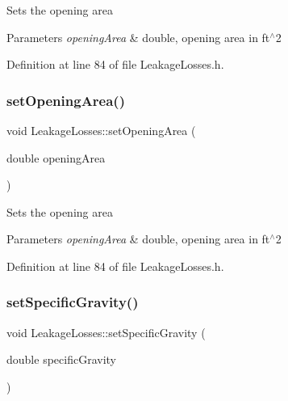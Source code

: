 Sets the opening area 
\begin{DoxyParams}{Parameters}
{\em opening\+Area} & double, opening area in ft$^\wedge$2 \\
\hline
\end{DoxyParams}


Definition at line 84 of file Leakage\+Losses.\+h.

\mbox{\label{class_leakage_losses_a417c9914af6b283695bdbd5e92451f9e}} 
\subsubsection{\texorpdfstring{set\+Opening\+Area()}{setOpeningArea()}\hspace{0.1cm}{\footnotesize\ttfamily [3/3]}}
{\footnotesize\ttfamily void Leakage\+Losses\+::set\+Opening\+Area (\begin{DoxyParamCaption}\item[{double}]{opening\+Area }\end{DoxyParamCaption})\hspace{0.3cm}{\ttfamily [inline]}}

Sets the opening area 
\begin{DoxyParams}{Parameters}
{\em opening\+Area} & double, opening area in ft$^\wedge$2 \\
\hline
\end{DoxyParams}


Definition at line 84 of file Leakage\+Losses.\+h.

\mbox{\label{class_leakage_losses_ab017828413655c5903374564e8718fac}} 
\subsubsection{\texorpdfstring{set\+Specific\+Gravity()}{setSpecificGravity()}\hspace{0.1cm}{\footnotesize\ttfamily [1/3]}}
{\footnotesize\ttfamily void Leakage\+Losses\+::set\+Specific\+Gravity (\begin{DoxyParamCaption}\item[{double}]{specific\+Gravity }\end{DoxyParamCaption})\hspace{0.3cm}{\ttfamily [inline]}}

